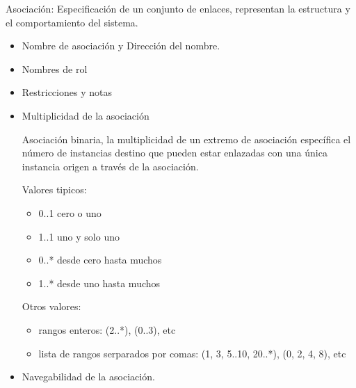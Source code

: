 \documentclass[12pt, twoside, openright]{report} %
\begin{document}
	Asociación: Especificación de un conjunto de enlaces, representan la
    estructura y el comportamiento del sistema.
	\begin{figure}[H]
		{\def\svgwidth{.5\textwidth}
		}
	\end{figure}
    \begin{itemize}	
    \item
      Nombre de asociación y Dirección del nombre.
	  \begin{figure}[H]
		{\def\svgwidth{.8\textwidth}
		}
	\end{figure}
    \item
      Nombres de rol
	  \begin{figure}[H]
		{\def\svgwidth{.7\textwidth}
		}
	\end{figure}
    \item
      Restricciones y notas
    \item
      Multiplicidad de la asociación

      Asociación binaria, la multiplicidad de un extremo de asociación
      específica el número de instancias destino que pueden estar
      enlazadas con una única instancia origen a través de la
      asociación.
	  \begin{figure}[H]
		{\def\svgwidth{.9\textwidth}
		}
	\end{figure}

	Valores tipicos:
	\begin{itemize}
		\item 0..1 cero o uno
		\item 1..1 uno y solo uno
		\item 0..* desde cero hasta muchos
		\item 1..* desde uno hasta muchos
	\end{itemize}
	\pagebreak

	Otros valores:
	\begin{itemize}
		\item rangos enteros: (2..*), (0..3), etc
		\item lista de rangos serparados por comas: (1, 3, 5..10, 20..*), (0, 2, 4, 8), etc
	\end{itemize}
    \item
      Navegabilidad de la asociación.


\end{itemize}
\end{document}
